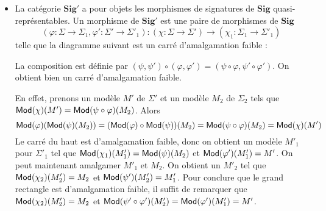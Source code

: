\documentclass[11pt,a4paper]{article}
\newcommand{\ph}{\varphi}
\newcommand{\itemz}{\item[$\triangleright$]}
\newcommand{\gr}{\textbf}
\newcommand{\info}[1]{\text{{\fontfamily{lmss}\selectfont #1}}}
\newcommand{\Mod}{\info{Mod}}
\newcommand{\1}{\mathbbm{1}}
\begin{document}
\begin{itemize}
\itemz La catégorie $\gr{Sig}'$ a pour objets les morphismes de signatures de $\gr{Sig}$ quasi-représentables. Un morphisme de $\gr{Sig}'$ est une paire de morphismes de $\gr{Sig}$
\[ (\ph : \Sigma \to \Sigma_1, \ph' : \Sigma' \to \Sigma'_1) : (\chi : \Sigma \to \Sigma') \to (\chi_1 : \Sigma_1 \to \Sigma'_1) \] telle que la diagramme suivant est un carré d'amalgamation faible :
\begin{center}
\end{center}
La composition est définie par $(\psi,\psi') \circ (\ph,\ph') = (\psi \circ \ph , \psi' \circ \ph')$. On obtient bien un carré d'amalgamation faible.
\begin{center}
\end{center}
En effet, prenons un modèle $M'$ de $\Sigma'$ et un modèle  $M_2$ de $\Sigma_2$ tels que $\Mod(\chi)(M') = \Mod(\psi \circ \ph)(M_2)$. Alors
\[ \Mod(\ph) (\Mod(\psi)(M_2)) = (\Mod(\ph) \circ \Mod(\psi))(M_2) = \Mod(\psi \circ \ph)(M_2) = \Mod(\chi)(M') \]
Le carré du haut est d'amalgamation faible, donc on obtient un modèle $M'_1$ pour $\Sigma'_1$ tel que $\Mod(\chi_1)(M'_1) = \Mod(\psi)(M_2)$ et $\Mod(\ph')(M'_1) = M'$. On peut maintenant amalgamer $M'_1$ et $M_2$. On obtient un $M'_2$ tel que $\Mod(\chi_2)(M'_2) = M_2$ et $\Mod(\psi')(M'_2) = M'_1$. Pour conclure que le grand rectangle est d'amalgamation faible, il suffit de remarquer que $\Mod(\chi_2)(M'_2) = M_2$ et $\Mod(\psi'\circ\ph')(M'_2) = \Mod(\ph')(M'_1) = M'$.\\\\

\end{itemize}
\end{document}
